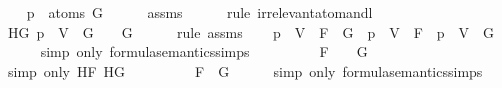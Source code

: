 \begin{isabellebody}
\ \ \isamarkupfalse%
\ {\isachardoublequoteopen}p\ {\isasymnotin}\ atoms\ G{\isachardoublequoteclose}\isanewline
\ \ \ \ \isamarkupfalse%
\ assms{\isacharparenleft}{}{\isacharparenright}\isanewline
\ \ \ \ \isamarkupfalse%
\ {\isacharparenleft}rule\ irrelevant{\isacharunderscore}atom{\isacharunderscore}and{\isacharunderscore}l{}{\isacharparenright}\isanewline
\ \ \isamarkupfalse%
\ \isamarkupfalse%
\ HG{\isacharcolon}\ {\isachardoublequoteopen}{\isasymA}{\isacharparenleft}p\ {\isacharcolon}{\isacharequal}\ V{\isacharparenright}\ {\isasymTurnstile}\ G\ {\isasymlongleftrightarrow}\ {\isasymA}\ {\isasymTurnstile}\ G{\isachardoublequoteclose}\isanewline
\ \ \ \ \isamarkupfalse%
\ {\isacharparenleft}rule\ assms{\isacharparenleft}{}{\isacharparenright}{\isacharparenright}\isanewline
\ \ \isamarkupfalse%
\ {\isachardoublequoteopen}{\isasymA}{\isacharparenleft}p\ {\isacharcolon}{\isacharequal}\ V{\isacharparenright}\ {\isasymTurnstile}\ {\isacharparenleft}F\ \isactrlbold {\isasymand}\ G{\isacharparenright}\ {\isacharequal}\ {\isacharparenleft}{\isasymA}{\isacharparenleft}p\ {\isacharcolon}{\isacharequal}\ V{\isacharparenright}\ {\isasymTurnstile}\ F\ {\isasymand}\ {\isasymA}{\isacharparenleft}p\ {\isacharcolon}{\isacharequal}\ V{\isacharparenright}\ {\isasymTurnstile}\ G{\isacharparenright}{\isachardoublequoteclose}\isanewline
\ \ \ \ \isamarkupfalse%
\ {\isacharparenleft}simp\ only{\isacharcolon}\ formula{\isacharunderscore}semantics{\isachardot}simps{\isacharparenleft}{}{\isacharparenright}{\isacharparenright}\isanewline
\ \ \isamarkupfalse%
\ \isamarkupfalse%
\ {\isachardoublequoteopen}{\isasymdots}\ {\isacharequal}\ {\isacharparenleft}{\isasymA}\ {\isasymTurnstile}\ F\ {\isasymand}\ {\isasymA}\ {\isasymTurnstile}\ G{\isacharparenright}{\isachardoublequoteclose}\isanewline
\ \ \ \ \isamarkupfalse%
\ {\isacharparenleft}simp\ only{\isacharcolon}\ HF\ HG{\isacharparenright}\isanewline
\ \ \isamarkupfalse%
\ \isamarkupfalse%
\ {\isachardoublequoteopen}{\isasymdots}\ {\isacharequal}\ {\isasymA}\ {\isasymTurnstile}\ {\isacharparenleft}F\ \isactrlbold {\isasymand}\ G{\isacharparenright}{\isachardoublequoteclose}\isanewline
\ \ \ \ \isamarkupfalse%
\ {\isacharparenleft}simp\ only{\isacharcolon}\ formula{\isacharunderscore}semantics{\isachardot}simps{\isacharparenleft}{}{\isacharparenright}{\isacharparenright}\isanewline

\end{isabellebody}
